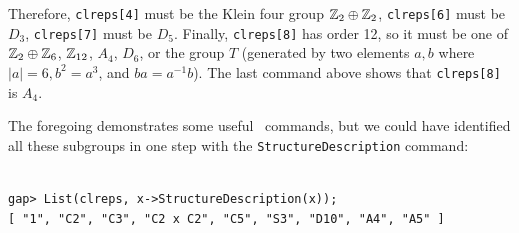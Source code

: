 \noindent Therefore, {\tt clreps[4]} must be the Klein four group $\mathbb{Z}_2 \oplus
\mathbb{Z}_2$, {\tt clreps[6]} must be $D_3$, 
{\tt clreps[7]}  must be $D_5$.  Finally, {\tt clreps[8]} has
order 12, so it must be one of $\mathbb{Z}_2 \oplus \mathbb{Z}_{6}$, $\mathbb{Z}_{12}$, $A_4$,
$D_6$, or %
the group $T$ (generated by two elements $a, b$ where $|a|=6, b^2 = a^3$, and $ba = a^{-1}b$).  
The last command above shows that {\tt clreps[8]} is $A_4$.

The foregoing demonstrates some useful \gap\ commands, but we could have
identified all these subgroups in one step with the {\tt StructureDescription} command:
{\codesize 
\begin{verbatim}

gap> List(clreps, x->StructureDescription(x));
[ "1", "C2", "C3", "C2 x C2", "C5", "S3", "D10", "A4", "A5" ]

\end{verbatim}}

